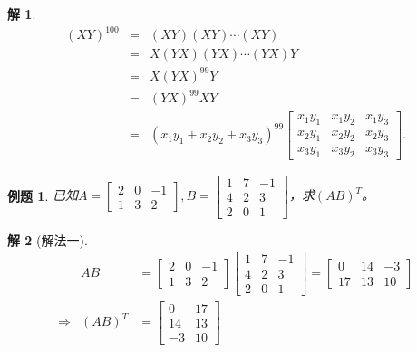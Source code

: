 \documentclass[a4paper]{book}
\newtheorem{eg}{例题}[chapter]
\newtheorem*{solution}{解}
\begin{document}
\begin{solution}
\begin{eqnarray*}
(XY)^{100} & = & (XY)(XY)\cdots (XY) \\
& = & X(YX)(YX)\cdots (YX)Y \\
& = & X(YX)^{99}Y \\
& = & (YX)^{99}XY \\
& = & (x_1y_1 + x_2y_2 + x_3y_3)^{99} \begin{bmatrix} x_1y_1 & x_1y_2 & x_1y_3 \\ x_2y_1 & x_2y_2 & x_2y_3 \\ x_3y_1 & x_3y_2 & x_3y_3 \end{bmatrix}.
\end{eqnarray*}
\end{solution}

\begin{eg}
已知$A = \begin{bmatrix} 2 & 0 & -1 \\ 1 & 3 & 2 \end{bmatrix}, B = \begin{bmatrix} 1 & 7 & -1 \\ 4 & 2 & 3 \\ 2 & 0 & 1 \end{bmatrix}$，求$(AB)^T$。
\end{eg}

\begin{solution}[解法一]
\begin{eqnarray*}
& AB & = \begin{bmatrix} 2 & 0 & -1 \\ 1 & 3 & 2 \end{bmatrix} \begin{bmatrix} 1 & 7 & -1 \\ 4 & 2 & 3 \\ 2 & 0 & 1 \end{bmatrix} = \begin{bmatrix} 0 & 14 & -3 \\ 17 & 13 & 10 \end{bmatrix}\\
\Longrightarrow & (AB)^T & = \begin{bmatrix} 0 & 17 \\ 14 & 13 \\ -3 & 10 \end{bmatrix}
\end{eqnarray*}
\end{solution}
\end{document}
